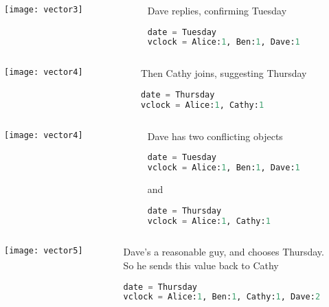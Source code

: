 \documentclass[aspectratio=169, 15pt,usenames,dvipsnames]{beamer}
\begin{document}
	\cprotEnv\begin{gdblank}
	\begin{columns}
		\begin{column}{0.5\textwidth}
			\texttt{[image: vector3]}			
		\end{column}
		\begin{column}{0.5\textwidth}				
			Dave replies, confirming Tuesday
			\begin{lstlisting}[language=Python]
date = Tuesday
vclock = Alice:1, Ben:1, Dave:1
			\end{lstlisting}
		\end{column}	
	\end{columns} 
	\end{gdblank}
	\cprotEnv\begin{gdblank}
	\begin{columns}
		\begin{column}{0.5\textwidth}
			\texttt{[image: vector4]}			
		\end{column}
		\begin{column}{0.5\textwidth}				
			Then Cathy joins, suggesting Thursday
			\begin{lstlisting}[language=Python]
date = Thursday
vclock = Alice:1, Cathy:1
			\end{lstlisting}
		\end{column}	
	\end{columns} 
	\end{gdblank}
	\cprotEnv\begin{gdblank}
	\begin{columns}
		\begin{column}{0.5\textwidth}
			\texttt{[image: vector4]}			
		\end{column}
		\begin{column}{0.5\textwidth}				
			Dave has two conflicting objects
			\begin{lstlisting}[language=Python]
date = Tuesday
vclock = Alice:1, Ben:1, Dave:1
			\end{lstlisting}
			and
			\begin{lstlisting}[language=Python]
date = Thursday
vclock = Alice:1, Cathy:1
			\end{lstlisting}
		\end{column}	
	\end{columns} 
	\end{gdblank}
	\cprotEnv\begin{gdblank}
	\begin{columns}
		\begin{column}{0.5\textwidth}
			\texttt{[image: vector5]}			
		\end{column}
		\begin{column}{0.5\textwidth}				
			Dave’s a reasonable guy, and chooses Thursday.\\So he sends this value back to Cathy
			\begin{lstlisting}[language=Python]
date = Thursday
vclock = Alice:1, Ben:1, Cathy:1, Dave:2
			\end{lstlisting}
		\end{column}	
	\end{columns} 
	\end{gdblank}
\end{document}
